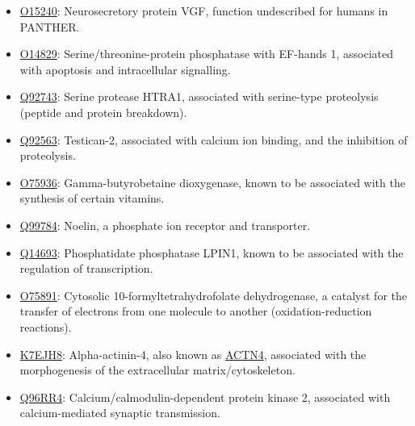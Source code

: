 {
\small

\begin{itemize}
\item \href{http://www.pantherdb.org/genes/gene.do?acc=HUMAN\%7CHGNC\%3D12684\%7CUniProtKB\%3DO15240}{O15240}: Neurosecretory protein VGF, function undescribed for humans in PANTHER.
\item \href{http://www.pantherdb.org/genes/gene.do?acc=HUMAN\%7CHGNC\%3D9243\%7CUniProtKB\%3DO14829}{O14829}: Serine/threonine-protein phosphatase with EF-hands 1, associated with apoptosis and intracellular signalling.
\item \href{http://www.pantherdb.org/genes/gene.do?acc=HUMAN\%7CHGNC\%3D9476\%7CUniProtKB\%3DQ92743}{Q92743}: Serine protease HTRA1, associated with serine-type proteolysis (peptide and protein breakdown).
\item \href{http://www.pantherdb.org/genes/gene.do?acc=HUMAN\%7CHGNC\%3D13564\%7CUniProtKB\%3DQ92563}{Q92563}: Testican-2, associated with calcium ion binding, and the inhibition of proteolysis.
\item \href{http://www.pantherdb.org/genes/gene.do?acc=HUMAN\%7CHGNC\%3D964\%7CUniProtKB\%3DO75936}{O75936}: Gamma-butyrobetaine dioxygenase, known to be associated with the synthesis of certain vitamins.
\item \href{http://www.pantherdb.org/genes/gene.do?acc=HUMAN\%7CHGNC\%3D17187\%7CUniProtKB\%3DQ99784}{Q99784}: Noelin, a phosphate ion receptor and transporter.
\item \href{http://www.pantherdb.org/genes/gene.do?acc=HUMAN\%7CHGNC\%3D13345\%7CUniProtKB\%3DQ14693}{Q14693}: Phosphatidate phosphatase LPIN1, known to be associated with the regulation of transcription.
\item \href{http://www.pantherdb.org/genes/gene.do?acc=HUMAN\%7CHGNC\%3D3978\%7CUniProtKB\%3DO75891}{O75891}: Cytosolic 10-formyltetrahydrofolate dehydrogenase, a catalyst for the transfer of electrons from one molecule to another (oxidation-reduction reactions).
\item \href{http://www.pantherdb.org/genes/gene.do?acc=HUMAN\%7CHGNC\%3D166\%7CUniProtKB\%3DO43707}{K7EJH8}: Alpha-actinin-4, also known as \href{https://www.uniprot.org/uniprot/K7EJH8}{ACTN4}, associated with the morphogenesis of the extracellular matrix/cytoskeleton.
\item \href{http://www.pantherdb.org/genes/gene.do?acc=HUMAN\%7CHGNC\%3D1470\%7CUniProtKB\%3DQ96RR4}{Q96RR4}: Calcium/calmodulin-dependent protein kinase 2, associated with calcium-mediated synaptic transmission.

\end{itemize}}
